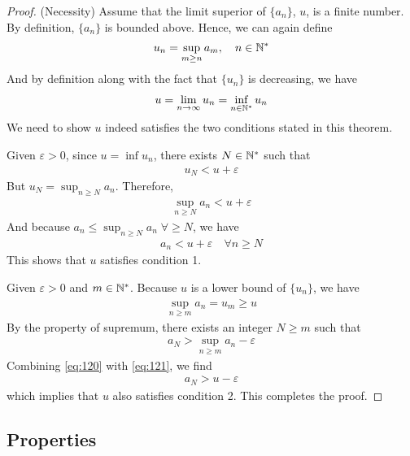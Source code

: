 \documentclass[thmcnt=section, 12pt]{my-elegantbook}
\begin{document}
\begin{proof}
    (Necessity) Assume that the limit superior of $\{a_n\}$, $u$, is a finite number. By definition, $\{a_n\}$ is bounded above. Hence, we can again define 
    \begin{align*}
        u_n = \sup_{m \geq n} a_m,
        \quad n \in \mathbb{N}^\ast
    \end{align*}
    And by definition along with the fact that $\{u_n\}$ is decreasing, we have 
    \begin{align*}
        u = \lim_{n \to \infty} u_n
        = \inf_{n \in \mathbb{N}^\ast} u_n
    \end{align*}
    We need to show $u$ indeed satisfies the two conditions stated in this theorem.

    Given $\varepsilon > 0$, since $u = \inf u_n$, there exists $N \in \mathbb{N}^\ast$ such that 
    \begin{align*}
        u_N < u + \varepsilon
    \end{align*}
    But $u_N = \sup_{n \geq N} a_n$. Therefore, 
    \begin{align*}
        \sup_{n \geq N} a_n < u + \varepsilon
    \end{align*}
    And because $a_n \leq \sup_{n \geq N} a_n \; \forall \geq N$, we have 
    \begin{align*}
        a_n < u + \varepsilon
        \quad \forall n \geq N
    \end{align*}
    This shows that $u$ satisfies condition 1.

    Given $\varepsilon > 0$ and $m \in \mathbb{N}^\ast$. Because $u$ is a lower bound of $\{u_n\}$, we have 
    \begin{align}
        \sup_{n \geq m} a_n = u_m \geq u
        \label{eq:120}
    \end{align}
    By the property of supremum, there exists an integer $N \geq m$ such that 
    \begin{align}
        a_N > \sup_{n \geq m} a_n - \varepsilon
        \label{eq:121}
    \end{align}
    Combining \eqref{eq:120} with \eqref{eq:121}, we find
    \begin{align*}
        a_N > u - \varepsilon
    \end{align*}
    which implies that $u$ also satisfies condition 2. This completes the proof.
\end{proof}


\subsection{Properties}
\end{document}
